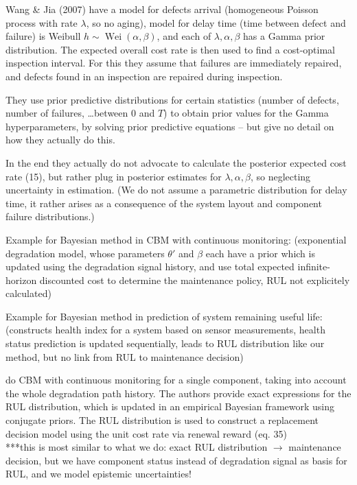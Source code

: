 \documentclass[authoryear]{elsarticle}
\newcommand{\wei}{\operatorname{Wei}} %
\begin{document}
\begin{scriptsize}
Wang \& Jia (2007) have a model for defects arrival (homogeneous Poisson process with rate $\lambda$, so no aging),
model for delay time (time between defect and failure) is Weibull $h \sim \wei(\alpha,\beta)$,
and each of $\lambda, \alpha, \beta$ has a Gamma prior distribution.
The expected overall cost rate is then used to find a cost-optimal inspection interval.
For this they assume that failures are immediately repaired,
and defects found in an inspection are repaired during inspection.

They use prior predictive distributions for certain statistics (number of defects, number of failures, \ldots between $0$ and $T$)
to obtain prior values for the Gamma hyperparameters,
by solving prior predictive equations -- but give no detail on how they actually do this.

In the end they actually do not advocate to calculate the posterior expected cost rate (15),
but rather plug in posterior estimates for $\lambda, \alpha, \beta$,
so neglecting uncertainty in estimation.
(We do not assume a parametric distribution for delay time,
it rather arises as a consequence of the system layout and component failure distributions.)

\end{scriptsize}

Example for Bayesian method in CBM with continuous monitoring: \cite{2011:elwany-et-al}
(exponential degradation model, whose parameters $\theta'$ and $\beta$ each have a prior
which is updated using the degradation signal history,
and use total expected infinite-horizon discounted cost to determine the maintenance policy,
RUL not explicitely calculated)

Example for Bayesian method in prediction of system remaining useful life: \cite{2012:sun-et-al}
(constructs health index for a system based on sensor measurements,
health status prediction is updated sequentially,
leads to RUL distribution like our method,
but no link from RUL to maintenance decision)

\cite{2013:si-et-al} do CBM with continuous monitoring for a single component,
taking into account the whole degradation path history.
The authors provide exact expressions for the RUL distribution, which is updated in an empirical Bayesian framework using conjugate priors.
The RUL distribution is used to construct a replacement decision model using the unit cost rate via renewal reward
(eq. 35)\\
***this is most similar to what we do: exact RUL distribution $\to$ maintenance decision,
but we have component status instead of degradation signal as basis for RUL,
and we model epistemic uncertainties!\\
\end{document}
